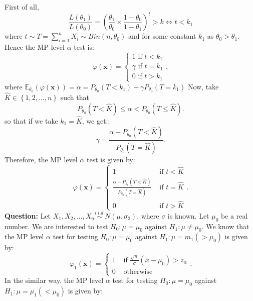 \documentclass{article}
\begin{document}
\newline\newline
First of all,
\[
	\frac{L\left( \theta_1 \right) }{L\left( \theta_0 \right) } = \left( \frac{\theta_1}{\theta_0} \times \frac{1- \theta_0}{1- \theta_1} \right)^{t} > k \iff t< k_1
\]
where $t \sim T = \sum_{i = 1}^{n} X_{i} \sim Bin\left( n, \theta_0 \right)  $ and for some constant $k_1$ as $\theta_0 > \theta_1$. Hence the MP level $\alpha$ test is:
\[
	\varphi\left( \mathbf{x} \right)  = \begin{cases}
		1 \text{ if } t < k_1\\
		\gamma \text{ if } t = k_1\\
		0 \text{ if } t > k_1
	\end{cases}
,\]
where $\mathbb{E}_{\theta_0} \left( \varphi \left( \mathbf{x} \right)  \right)  = \alpha = P_{\theta_0}\left( T < k_1 \right) + \gamma P_{\theta_0} \left( T = k_1 \right)   $
\newline\newline
Now, take $\hat{K} \in  \left\{ 1,2,\dots,n \right\} $ such that 
\[
	P_{\theta_0}\left( T < \hat{K} \right) \le \alpha < P_{\theta_0}\left( T\le \hat{K} \right) 
.\]
so that if we take $k_1 = \hat{K}$, we get::
\[
	\gamma = \frac{\alpha - P_{\theta_0}\left( T < \hat{K} \right)  }{P_{\theta_0}\left( T = \hat{K} \right) }
.\]
Therefore, the MP level $\alpha$ test is given by:
\[
	\varphi \left( \mathbf{x} \right)  = \begin{cases}
		1 & \text{ if } t<\hat{K}\\
		\frac{\alpha - P_{\theta_0}\left( T < \hat{K} \right)  }{P_{\theta_0}\left( T = \hat{K} \right)} & \text{ if } t = \hat{K}\\
			0 & \text{ if } t > \hat{K}
	\end{cases}
.\] 
\textbf{Question:} Let $X_1,X_2,\dots,X_{n} \overset{i.i.d.}{\sim} N\left( \mu,\sigma_2\right) $, where $\sigma$ is known. Let $\mu_0$ be a real number. We are interested to test $H_0 : \mu = \mu_0$ against $H_1 : \mu \neq \mu_0 $.
\newline\newline
We know that the MP level $\alpha$ test for testing $H_0:\mu=\mu_0$ against $H_1:\mu = m_1\left( >\mu_0 \right) $ is given by:
\[
	\varphi_1\left( \mathbf{x} \right) = \begin{cases}
		1 & \text{ if } \frac{\sqrt{n} }{\sigma} \left( \overline{x} - \mu_0 \right) > z_{\alpha}\\
		0 & \text{ otherwise}
	\end{cases}
.\]
In the similar way, the MP level $\alpha$ test for testing $H_0 : \mu = \mu_0$ against $H_1 : \mu = \mu_1\left( <\mu_0 \right) $ is given by:
\end{document}
